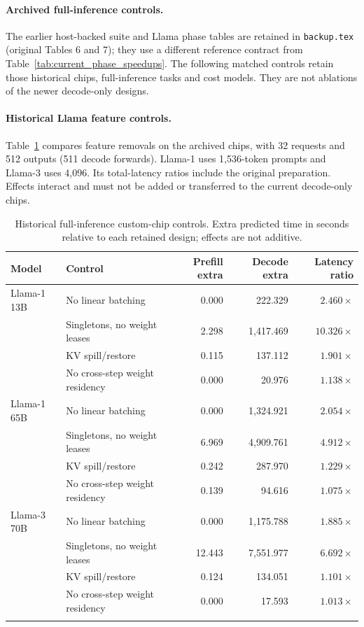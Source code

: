\paragraph{Archived full-inference controls.}
The earlier host-backed suite and Llama phase tables are retained in
\texttt{backup.tex} (original Tables 6 and 7); they use a different reference
contract from Table~\ref{tab:current_phase_speedups}. The following matched
controls retain those historical chips, full-inference tasks and cost models.
They are not ablations of the newer decode-only designs.
\paragraph{Historical Llama feature controls.}
Table~\ref{tab:uniform_llama_controls} compares feature removals on the
archived chips, with 32 requests and 512 outputs (511 decode forwards).
Llama-1 uses 1,536-token prompts and Llama-3 uses 4,096. Its total-latency
ratios include the original preparation. Effects interact and must not be
added or transferred to the current decode-only chips.

\begin{table}[t]
\centering\scriptsize
\caption{Historical full-inference custom-chip controls. Extra predicted time in seconds relative to each retained design; effects are not additive.}
\label{tab:uniform_llama_controls}
\begin{tabular}{@{}llrrr@{}}
\toprule
Model & Control & Prefill extra & Decode extra & Latency ratio \\
\midrule
Llama-1 13B & No linear batching & 0.000 & 222.329 & $2.460\times$ \\
 & Singletons, no weight leases & 2.298 & 1,417.469 & $10.326\times$ \\
 & KV spill/restore & 0.115 & 137.112 & $1.901\times$ \\
 & No cross-step weight residency & 0.000 & 20.976 & $1.138\times$ \\
\addlinespace
Llama-1 65B & No linear batching & 0.000 & 1,324.921 & $2.054\times$ \\
 & Singletons, no weight leases & 6.969 & 4,909.761 & $4.912\times$ \\
 & KV spill/restore & 0.242 & 287.970 & $1.229\times$ \\
 & No cross-step weight residency & 0.139 & 94.616 & $1.075\times$ \\
\addlinespace
Llama-3 70B & No linear batching & 0.000 & 1,175.788 & $1.885\times$ \\
 & Singletons, no weight leases & 12.443 & 7,551.977 & $6.692\times$ \\
 & KV spill/restore & 0.124 & 134.051 & $1.101\times$ \\
 & No cross-step weight residency & 0.000 & 17.593 & $1.013\times$ \\
\addlinespace
\bottomrule
\end{tabular}
\end{table}

